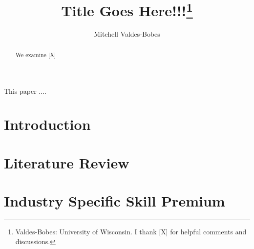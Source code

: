 \documentclass[12pt]{article}
\begin{document}
\title{Title Goes Here!!!\thanks{Valdes-Bobes: University of Wisconsin.
		I thank [X] for helpful comments and discussions.}}
\author{Mitchell Valdes-Bobes}
\maketitle
\begin{abstract}
	We examine [X]
\end{abstract}
\thispagestyle{empty}

\pagebreak{}
This paper .... 



\section{Introduction}\label{sec:introduction}

\section{Literature Review}\label{sec:literature_review}

\section{Industry Specific Skill Premium}
\end{document}
